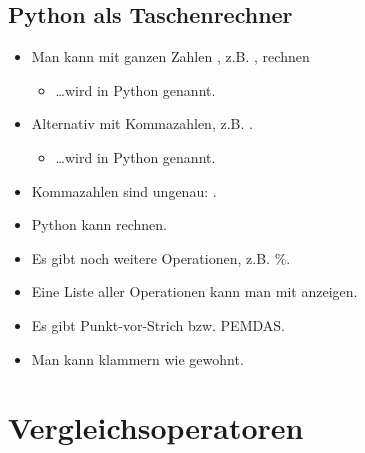 \subsection{Python als Taschenrechner}
\begin{frame}
    \slidehead
    \begin{itemize}[<+->]
        \item Man kann mit ganzen Zahlen , z.B. , rechnen
            \begin{itemize}
                \item \dots wird in Python  genannt.
            \end{itemize}
        \item Alternativ mit Kommazahlen, z.B. .
            \begin{itemize}
                \item \dots wird in Python  genannt.
            \end{itemize}
        \item Kommazahlen sind ungenau: .
        \item Python kann \pythoninline{+, -, *, /} rechnen.
        \item Es gibt noch weitere Operationen, z.B. \pythoninline{**, //,} {\color{gray} \%}.
        \item Eine Liste aller Operationen kann man mit  anzeigen.
        \item Es gibt Punkt-vor-Strich bzw. PEMDAS.
        \item Man kann klammern \pythoninline{()} wie gewohnt.
    \end{itemize}
\end{frame}

\livecoding

\section{Vergleichsoperatoren}
